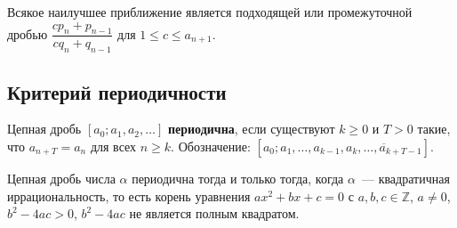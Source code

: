 \documentclass[12pt]{article}
\begin{document}
	\begin{theorem}
		Всякое наилучшее приближение является подходящей или промежуточной дробью $\dfrac{cp_n + p_{n-1}}{cq_n + q_{n-1}}$ для $1 \leqslant c \leqslant a_{n+1}$.
	\end{theorem}
	
	\subsection{Критерий периодичности}
	
	\begin{definition}
		Цепная дробь $[a_0; a_1, a_2, \dots]$ \textbf{периодична}, если существуют $k \geqslant 0$ и $T > 0$ такие, что $a_{n+T} = a_n$ для всех $n \geqslant k$. Обозначение: $[a_0; a_1, \dots, a_{k-1}, \overline{a_k, \dots, a_{k+T-1}}]$.
	\end{definition}
	
	\begin{theorem}[Лагранж]
		Цепная дробь числа $\alpha$ периодична тогда и только тогда, когда $\alpha$~--- квадратичная иррациональность, то есть корень уравнения $ax^2 + bx + c = 0$ с $a, b, c \in \mathbb{Z}$, $a \neq 0$, $b^2 - 4ac > 0$, $b^2 - 4ac$ не является полным квадратом.
	\end{theorem}
	
\end{document}
